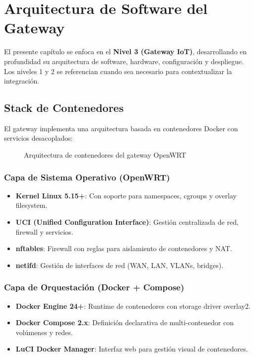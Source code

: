 \section{Arquitectura de Software del Gateway}

El presente capítulo se enfoca en el \textbf{Nivel 3 (Gateway IoT)}, desarrollando en profundidad su arquitectura de software, hardware, configuración y despliegue. Los niveles 1 y 2 se referencian cuando sea necesario para contextualizar la integración.

\subsection{Stack de Contenedores}

El gateway implementa una arquitectura basada en contenedores Docker con servicios desacoplados:

\begin{figure}[h]
\centering
\caption{Arquitectura de contenedores del gateway OpenWRT}
\label{fig:gateway-stack}
\end{figure}

\subsubsection{Capa de Sistema Operativo (OpenWRT)}

\begin{itemize}
    \item \textbf{Kernel Linux 5.15+}: Con soporte para namespaces, cgroups y overlay filesystem.
    \item \textbf{UCI (Unified Configuration Interface)}: Gestión centralizada de red, firewall y servicios.
    \item \textbf{nftables}: Firewall con reglas para aislamiento de contenedores y NAT.
    \item \textbf{netifd}: Gestión de interfaces de red (WAN, LAN, VLANs, bridges).
\end{itemize}

\subsubsection{Capa de Orquestación (Docker + Compose)}

\begin{itemize}
    \item \textbf{Docker Engine 24+}: Runtime de contenedores con storage driver overlay2.
    \item \textbf{Docker Compose 2.x}: Definición declarativa de multi-contenedor con volúmenes y redes.
    \item \textbf{LuCI Docker Manager}: Interfaz web para gestión visual de contenedores.
\end{itemize}

